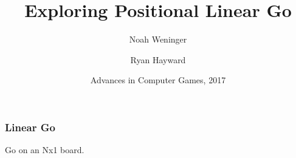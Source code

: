 \documentclass{beamer}
\title{Exploring Positional Linear Go}
\author[Weninger, Hayward]
{Noah Weninger \and Ryan Hayward}
\institute[University of Alberta]
{
  Department of Computing Science\\
  University of Alberta\\
  Canada
}
\date[ACG 2017]
{Advances in Computer Games, 2017}
\begin{document}
    \frame{\titlepage}

    \begin{frame}
        \frametitle{Linear Go}
        Go on an Nx1 board.
        \bigskip
        \begin{center}
            \showgoban[b2,k2]
        \end{center}
    \end{frame}
\end{document}

